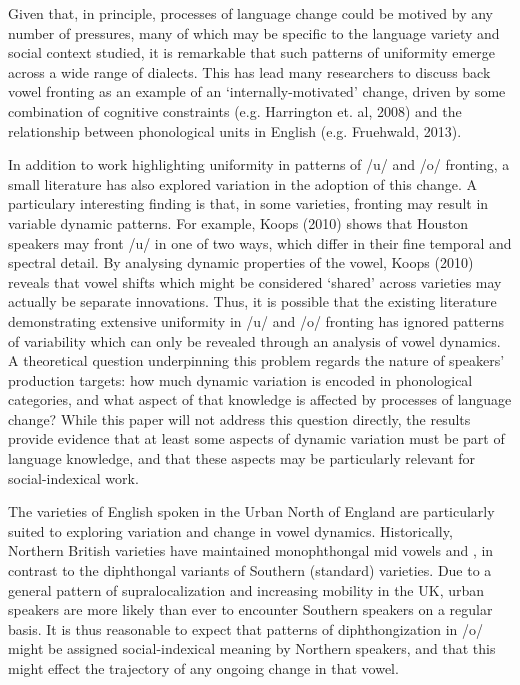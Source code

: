\documentclass[PWPL]{article}
\begin{document}
Given that, in principle, processes of language change could be motived by any number of pressures, many of which may be specific to the language variety and social context studied, it is remarkable that such patterns of uniformity emerge across a wide range of dialects. This has lead many researchers to discuss back vowel fronting as an example of an `internally-motivated' change, driven by some combination of cognitive constraints (e.g. Harrington et. al, 2008) and the relationship between phonological units in English (e.g. Fruehwald, 2013). 

In addition to work highlighting uniformity in patterns of /u/ and /o/ fronting, a small literature has also explored variation in the adoption of this change. A particulary interesting finding is that, in some varieties, fronting may result in variable dynamic patterns. For example, Koops (2010) shows that Houston speakers may front /u/ in one of two ways, which differ in their fine temporal and spectral detail. By analysing dynamic properties of the vowel, Koops (2010) reveals that vowel shifts which might be considered `shared' across varieties may actually be separate innovations. Thus, it is possible that the existing literature demonstrating extensive uniformity in /u/ and /o/ fronting has ignored patterns of variability which can only be revealed through an analysis of vowel dynamics. A theoretical question underpinning this problem regards the nature of speakers' production targets: how much dynamic variation is encoded in phonological categories, and what aspect of that knowledge is affected by processes of language change? While this paper will not address this question directly, the results provide evidence that at least some aspects of dynamic variation must be part of language knowledge, and that these aspects may be particularly relevant for social-indexical work.

The varieties of English spoken in the Urban North of England are particularly suited to exploring variation and change in vowel dynamics. Historically, Northern British varieties have maintained monophthongal mid vowels  and , in contrast to the diphthongal variants of Southern (standard) varieties. Due to a general pattern of supralocalization and increasing mobility in the UK, urban speakers are more likely than ever to encounter Southern speakers on a regular basis. 
It is thus reasonable to expect that patterns of diphthongization in /o/ might be assigned social-indexical meaning by Northern speakers, and that this might effect the trajectory of any ongoing change in that vowel. 
\end{document}
